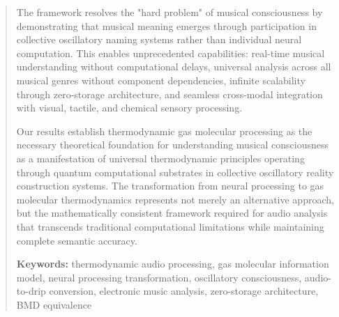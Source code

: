 \begin{abstract}
The framework resolves the "hard problem" of musical consciousness by demonstrating that musical meaning emerges through participation in collective oscillatory naming systems rather than individual neural computation. This enables unprecedented capabilities: real-time musical understanding without computational delays, universal analysis across all musical genres without component dependencies, infinite scalability through zero-storage architecture, and seamless cross-modal integration with visual, tactile, and chemical sensory processing.

Our results establish thermodynamic gas molecular processing as the necessary theoretical foundation for understanding musical consciousness as a manifestation of universal thermodynamic principles operating through quantum computational substrates in collective oscillatory reality construction systems. The transformation from neural processing to gas molecular thermodynamics represents not merely an alternative approach, but the mathematically consistent framework required for audio analysis that transcends traditional computational limitations while maintaining complete semantic accuracy.

\textbf{Keywords:} thermodynamic audio processing, gas molecular information model, neural processing transformation, oscillatory consciousness, audio-to-drip conversion, electronic music analysis, zero-storage architecture, BMD equivalence

\end{abstract}
